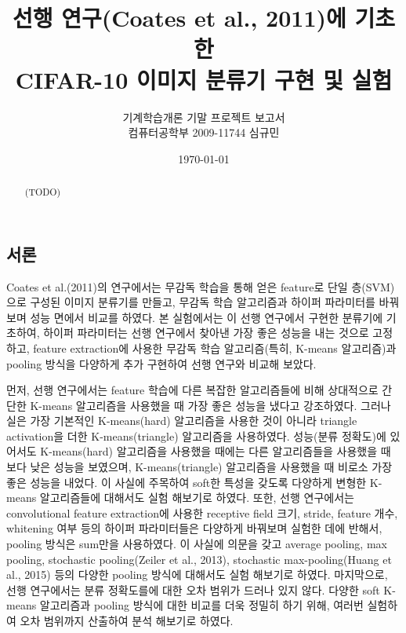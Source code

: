 \documentclass[a4paper,9pt]{article}
\begin{document}
\title{선행 연구(Coates et al., 2011)에 기초한 \\
CIFAR-10 이미지 분류기 구현 및 실험}
\author{기계학습개론 기말 프로젝트 보고서 \\
컴퓨터공학부 2009-11744 심규민}
\date{\koreandate\today}

\maketitle

\begin{abstract}
(TODO)
\end{abstract}

\tableofcontents

\pagebreak

\begin{multicols}{2}

\section{서론}

Coates et al.(2011)의 연구에서는 무감독 학습을 통해 얻은 feature로 단일 층(SVM)으로 구성된 이미지 분류기를 만들고, 무감독 학습 알고리즘과 하이퍼 파라미터를 바꿔보며 성능 면에서 비교를 하였다.
본 실험에서는 이 선행 연구에서 구현한 분류기에 기초하여, 하이퍼 파라미터는 선행 연구에서 찾아낸 가장 좋은 성능을 내는 것으로 고정하고, feature extraction에 사용한 무감독 학습 알고리즘(특히, K-means 알고리즘)과 pooling 방식을 다양하게 추가 구현하여 선행 연구와 비교해 보았다.

먼저, 선행 연구에서는 feature 학습에 다른 복잡한 알고리즘들에 비해 상대적으로 간단한 K-means 알고리즘을 사용했을 때 가장 좋은 성능을 냈다고 강조하였다.
그러나 실은 가장 기본적인 K-means(hard) 알고리즘을 사용한 것이 아니라 triangle activation을 더한 K-means(triangle) 알고리즘을 사용하였다.
성능(분류 정확도)에 있어서도 K-means(hard) 알고리즘을 사용했을 때에는 다른 알고리즘들을 사용했을 때 보다 낮은 성능을 보였으며, K-means(triangle) 알고리즘을 사용했을 때 비로소 가장 좋은 성능을 내었다.
이 사실에 주목하여 soft한 특성을 갖도록 다양하게 변형한 K-means 알고리즘들에 대해서도 실험 해보기로 하였다.
또한, 선행 연구에서는 convolutional feature extraction에 사용한 receptive field 크기, stride, feature 개수, whitening 여부 등의 하이퍼 파라미터들은 다양하게 바꿔보며 실험한 데에 반해서, pooling 방식은 sum만을 사용하였다.
이 사실에 의문을 갖고 average pooling, max pooling, stochastic pooling(Zeiler et al., 2013), stochastic max-pooling(Huang et al., 2015) 등의 다양한 pooling 방식에 대해서도 실험 해보기로 하였다.
마지막으로, 선행 연구에서는 분류 정확도를에 대한 오차 범위가 드러나 있지 않다.
다양한 soft K-means 알고리즘과 pooling 방식에 대한 비교를 더욱 정밀히 하기 위해, 여러번 실험하여 오차 범위까지 산출하여 분석 해보기로 하였다.


\end{multicols}
\end{document}
